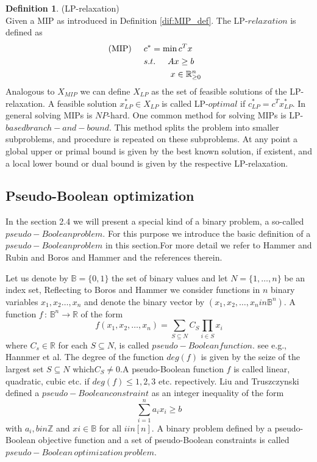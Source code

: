 \documentclass[11pt]{article}
\theoremstyle{definition}
\newtheorem{definition}{Definition}[section] %
\begin{document}
\begin{definition}
(LP-relaxation)\\
Given a MIP as introduced in Definition \ref{dif:MIP_def}. The LP-$relaxation$ is defined as
	\begin{align*}
	\text{(MIP)} \hspace{5mm} &c^* = \text{min}\,c^Tx& \\
	&s.t.\hspace{5mm} Ax \geq b  \\
	&\hspace{11mm} x \in \mathbb{R}_{\geq0}^n 
	\label{dif:LP}
	\end{align*}
Analogous to $X_{MIP}$ we can define $X_{LP}$ as the set of feasible solutions of the LP-relaxation. A feasible solution $x_{LP}^* \in X_{LP}$ is called LP-$optimal$ if $c_{LP}^* = c^Tx_{LP}^*$. In general solving MIPs is $NP$-hard. One common method for solving MIPs is LP-$based branch-and-bound$. This method splits the problem into smaller subproblems, and procedure is repeated on these subproblems. At any point a global upper or primal bound is given by the best known solution, if existent, and a local lower bound or dual bound is given by the respective LP-relaxation.\par
\end{definition}

\subsection{Pseudo-Boolean optimization}
 In the section 2.4 we will present a special kind of a binary problem, a so-called $pseudo-Boolean problem$. For this purpose we introduce the basic definition of a $pseudo-Boolean problem$ in this section.For more detail we refer to Hammer and Rubin and Boros and Hammer and the references therein.\par
 Let us denote by $\mathbb{B} = \{0,1 \}$ the set of binary values and let $N = \{ 1, \dots ,n  \}$ be an index set, Reflecting to Boros and Hammer we consider functions in $n$ binary variables $x_1, x_2\dots ,x_n$ and denote the binary vector by $(x_1, x_2, \dots,x_n in \mathbb{B}^n)$. A function $f\,:\, \mathbb{B}^n \rightarrow\mathbb{R}$ of the form 
 $$\displaystyle{f(x_1,x_2,\dots,x_n) = \sum \limits_{S \subseteq N} C_S  \prod \limits_{i \in S}x_i}$$
 where $C_s \in \mathbb{R}$ for each $ S \subseteq N$, is called $pseudo-Boolean function$. see e.g., Hannmer et al. The degree of the function $deg(f)$ is given by the seize of the largest set $S \subseteq	N$ which$C_S \neq 0$.A pseudo-Boolean function $f$ is called linear, quadratic, cubic etc. if $deg(f) \leq 1,2,3 $ etc. repectively. Liu and Truszczynski defined a $pseudo-Boolean constraint $ as an integer inequality of the form 
 $$\sum \limits_{i=1}^{n} a_ix_i \geq b$$
 with $a_i,b in \mathbb{Z}$ and $xi\in \mathbb{B}$ for all $i in [n]$. A binary problem defined by a pseudo-Boolean objective function and a set of pseudo-Boolean constraints is called $pseudo-Boolean\, optimization\, problem$. \par

 
\end{document}
